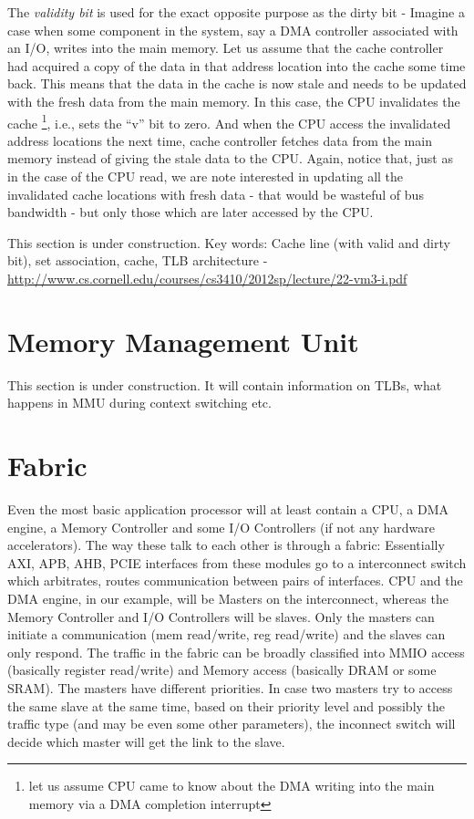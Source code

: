 The \emph{validity bit} is used for the exact opposite purpose as the dirty bit - Imagine a case when some component in the system, say a DMA controller associated with an I/O, writes into the main memory. Let us assume that the cache controller had acquired a copy of the data in that address location into the cache some time back. This means that the data in the cache is now stale and needs to be updated with the fresh data from the main memory. In this case, the CPU invalidates the cache \footnote{let us assume CPU came to know about the DMA writing into the main memory via a DMA completion interrupt}, i.e., sets the ``v'' bit to zero. And when the CPU access the invalidated address locations the next time, cache controller fetches data from the main memory instead of giving the stale data to the CPU. Again, notice that, just as in the case of the CPU read, we are note interested in updating all the invalidated cache locations with fresh data - that would be wasteful of bus bandwidth - but only those which are later accessed by the CPU. 

This section is under construction. Key words: Cache line (with valid and dirty bit), set association, cache, TLB architecture - \url{http://www.cs.cornell.edu/courses/cs3410/2012sp/lecture/22-vm3-i.pdf}

\section{Memory Management Unit}
This section is under construction. It will contain information on TLBs, what happens in MMU during context switching etc. 

\section{Fabric}
Even the most basic application processor will at least contain a CPU, a DMA engine, a Memory Controller and some I/O Controllers (if not any hardware accelerators). The way these talk to each other is through a fabric: Essentially AXI, APB, AHB, PCIE interfaces from these modules go to a interconnect switch which arbitrates, routes communication between pairs of interfaces. CPU and the DMA engine, in our example, will be Masters on the interconnect, whereas the Memory Controller and I/O Controllers will be slaves. Only the masters can initiate a communication (mem read/write, reg read/write) and the slaves can only respond. The traffic in the fabric can be broadly classified into MMIO access (basically register read/write) and Memory access (basically DRAM or some SRAM). The masters have different priorities. In case two masters try to access the same slave at the same time, based on their priority level and possibly the traffic type (and may be even some other parameters), the inconnect switch will decide which master will get the link to the slave. 

